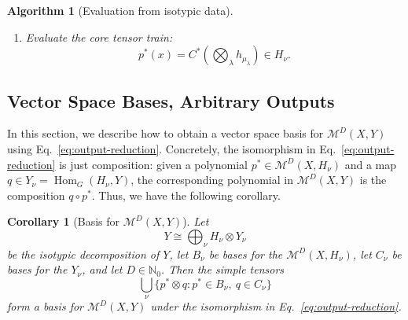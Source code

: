 \documentclass[11pt]{article}
\newcommand{\dsN}{\mathbb{N}}
\newcommand{\scM}{\mathcal{M}}
\newcommand{\HomG}[2]{\operatorname{Hom}_G\!\left(#1,#2\right)}
\newtheorem{corollary}[theorem]{Corollary}
\newtheorem{algorithm}[theorem]{Algorithm}
\theoremstyle{definition}
\begin{document}
\begin{algorithm}[Evaluation from isotypic data]
\begin{enumerate}[label=\textbf{Step \arabic*.},leftmargin=2.8cm]
    \item Evaluate the core tensor train:
    \[
      p^*(x)
      =
      C^*\left(\bigotimes_\lambda h_{\mu_\lambda}\right)
      \in H_\nu.
    \]
  \end{enumerate}
\end{algorithm}



\subsection{Vector Space Bases, Arbitrary Outputs}\label{sec:arbitrary-bases}

In this section, we describe how to obtain a vector space basis for $\scM^D(X,Y)$ using Eq.~\eqref{eq:output-reduction}. Concretely, the isomorphism in Eq.~\eqref{eq:output-reduction} is just composition: given a polynomial $p^* \in \scM^D(X,H_\nu)$ and a map $q \in Y_\nu = \HomG{H_\nu}{Y}$, the corresponding polynomial in $\scM^D(X,Y)$ is the composition $q \circ p^*$. Thus, we have the following corollary.

\begin{corollary}[Basis for $\scM^D(X,Y)$]\label{cor:arbitrary-output-basis}
  Let
  \[
    Y\cong \bigoplus_{\nu} H_\nu\otimes Y_\nu
  \]
  be the isotypic decomposition of $Y$, let $B_\nu$ be bases for the $\scM^D(X,H_\nu)$, let $C_\nu$ be bases for the $Y_\nu$, and let $D\in\dsN_0$. Then the simple tensors
  \[
    \bigcup_{\nu}\{p^*\otimes q : p^*\in B_\nu,\ q\in C_\nu\}
  \]
  form a basis for $\scM^D(X,Y)$ under the isomorphism in Eq.~\eqref{eq:output-reduction}.
\end{corollary}
\end{document}

